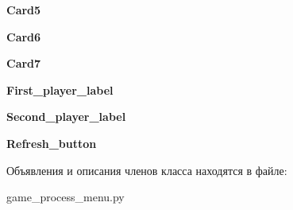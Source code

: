 \begin{DoxyCompactItemize}
\item 
\mbox{\label{classgame__process__menu_1_1_ui___main_window_a5770b1b8c43ef65ffd98a51d264ec1cf}} 
{\bfseries Card5}
\item 
\mbox{\label{classgame__process__menu_1_1_ui___main_window_a63579e3810024515d2062d3bb53a6b96}} 
{\bfseries Card6}
\item 
\mbox{\label{classgame__process__menu_1_1_ui___main_window_a48cca9daf6b410f491673ad7159929b5}} 
{\bfseries Card7}
\item 
\mbox{\label{classgame__process__menu_1_1_ui___main_window_a2537ea406e32bcc8557acf04c8900c5d}} 
{\bfseries First\+\_\+player\+\_\+label}
\item 
\mbox{\label{classgame__process__menu_1_1_ui___main_window_a0373f61bb40a4dc408971e37e2c47fa1}} 
{\bfseries Second\+\_\+player\+\_\+label}
\item 
\mbox{\label{classgame__process__menu_1_1_ui___main_window_a635cfe75923bc518a4a95d1903dc0652}} 
{\bfseries Refresh\+\_\+button}
\end{DoxyCompactItemize}


Объявления и описания членов класса находятся в файле\+:\begin{DoxyCompactItemize}
\item 
game\+\_\+process\+\_\+menu.\+py\end{DoxyCompactItemize}
